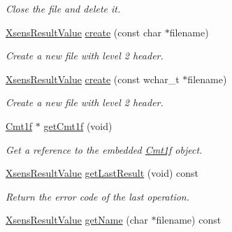 \begin{DoxyCompactItemize}
\begin{DoxyCompactList}\small\item\em \-Close the file and delete it. \end{DoxyCompactList}\item 
\hypertarget{classxsens_1_1Cmt2f_a5c4844e3bcf4bb897e902bf4caa7659c}{\hyperlink{group__enums_ga822a2260a20af524029eef9e9a51ff6f}{\-Xsens\-Result\-Value} \hyperlink{classxsens_1_1Cmt2f_a5c4844e3bcf4bb897e902bf4caa7659c}{create} (const char $\ast$filename)}\label{classxsens_1_1Cmt2f_a5c4844e3bcf4bb897e902bf4caa7659c}

\begin{DoxyCompactList}\small\item\em \-Create a new file with level 2 header. \end{DoxyCompactList}\item 
\hypertarget{classxsens_1_1Cmt2f_a182ff3dc4af83a61907468422e5c6c36}{\hyperlink{group__enums_ga822a2260a20af524029eef9e9a51ff6f}{\-Xsens\-Result\-Value} \hyperlink{classxsens_1_1Cmt2f_a182ff3dc4af83a61907468422e5c6c36}{create} (const wchar\-\_\-t $\ast$filename)}\label{classxsens_1_1Cmt2f_a182ff3dc4af83a61907468422e5c6c36}

\begin{DoxyCompactList}\small\item\em \-Create a new file with level 2 header. \end{DoxyCompactList}\item 
\hypertarget{classxsens_1_1Cmt2f_a9c6f527aa98b762a92867a559e2437bb}{\hyperlink{classxsens_1_1Cmt1f}{\-Cmt1f} $\ast$ \hyperlink{classxsens_1_1Cmt2f_a9c6f527aa98b762a92867a559e2437bb}{get\-Cmt1f} (void)}\label{classxsens_1_1Cmt2f_a9c6f527aa98b762a92867a559e2437bb}

\begin{DoxyCompactList}\small\item\em \-Get a reference to the embedded \hyperlink{classxsens_1_1Cmt1f}{\-Cmt1f} object. \end{DoxyCompactList}\item 
\hypertarget{classxsens_1_1Cmt2f_afe0ac149d99848609f3ff7ee9b7890c0}{\hyperlink{group__enums_ga822a2260a20af524029eef9e9a51ff6f}{\-Xsens\-Result\-Value} \hyperlink{classxsens_1_1Cmt2f_afe0ac149d99848609f3ff7ee9b7890c0}{get\-Last\-Result} (void) const }\label{classxsens_1_1Cmt2f_afe0ac149d99848609f3ff7ee9b7890c0}

\begin{DoxyCompactList}\small\item\em \-Return the error code of the last operation. \end{DoxyCompactList}\item 
\hypertarget{classxsens_1_1Cmt2f_a01a9f99cc134707db1b493bfa0eb9f21}{\hyperlink{group__enums_ga822a2260a20af524029eef9e9a51ff6f}{\-Xsens\-Result\-Value} \hyperlink{classxsens_1_1Cmt2f_a01a9f99cc134707db1b493bfa0eb9f21}{get\-Name} (char $\ast$filename) const }\label{classxsens_1_1Cmt2f_a01a9f99cc134707db1b493bfa0eb9f21}


\end{DoxyCompactItemize}
